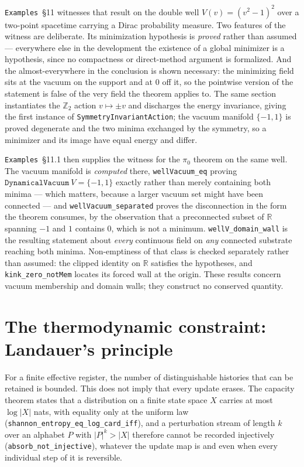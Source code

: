 \documentclass{article}
\begin{document}
\texttt{Examples}~\S11 witnesses that result on the double well $V(v) = (v^2-1)^2$ over a two-point spacetime carrying a Dirac probability measure. Two features of the witness are deliberate. Its minimization hypothesis is \emph{proved} rather than assumed --- everywhere else in the development the existence of a global minimizer is a hypothesis, since no compactness or direct-method argument is formalized. And the almost-everywhere in the conclusion is shown necessary: the minimizing field sits at the vacuum on the support and at $0$ off it, so the pointwise version of the statement is false of the very field the theorem applies to. The same section instantiates the $\mathbb{Z}_2$ action $v \mapsto \pm v$ and discharges the energy invariance, giving the first instance of \texttt{SymmetryInvariantAction}; the vacuum manifold $\{-1,1\}$ is proved degenerate and the two minima exchanged by the symmetry, so a minimizer and its image have equal energy and differ.

\texttt{Examples}~\S11.1 then supplies the witness for the $\pi_0$ theorem on the same well. The vacuum manifold is \emph{computed} there, \nolinkurl{wellVacuum_eq} proving $\texttt{DynamicalVacuum}\ V = \{-1,1\}$ exactly rather than merely containing both minima --- which matters, because a larger vacuum set might have been connected --- and \nolinkurl{wellVacuum_separated} proves the disconnection in the form the theorem consumes, by the observation that a preconnected subset of $\mathbb{R}$ spanning $-1$ and $1$ contains $0$, which is not a minimum. \nolinkurl{wellV_domain_wall} is the resulting statement about \emph{every} continuous field on \emph{any} connected substrate reaching both minima. Non-emptiness of that class is checked separately rather than assumed: the clipped identity on $\mathbb{R}$ satisfies the hypotheses, and \nolinkurl{kink_zero_notMem} locates its forced wall at the origin. These results concern vacuum membership and domain walls; they construct no conserved quantity.

\section{The thermodynamic constraint: Landauer's principle}
\label{sec:supp-erasure-section}
For a finite effective register, the number of distinguishable histories that can be retained is bounded. This does not imply that every update erases. The capacity theorem states that a distribution on a finite state space $X$ carries at most $\log|X|$ nats, with equality only at the uniform law (\nolinkurl{shannon_entropy_eq_log_card_iff}), and a perturbation stream of length $k$ over an alphabet $P$ with $|P|^k > |X|$ therefore cannot be recorded injectively (\nolinkurl{absorb_not_injective}), whatever the update map is and even when every individual step of it is reversible.
\end{document}
